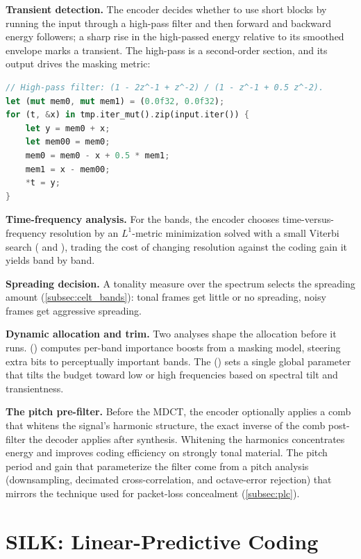 \textbf{Transient detection.} The encoder decides whether to use short blocks by
running the input through a high-pass filter and then forward and backward energy
followers; a sharp rise in the high-passed energy relative to its smoothed
envelope marks a transient. The high-pass is a second-order section, and its
output drives the masking metric:

\begin{lstlisting}[language=Rust]
// High-pass filter: (1 - 2z^-1 + z^-2) / (1 - z^-1 + 0.5 z^-2).
let (mut mem0, mut mem1) = (0.0f32, 0.0f32);
for (t, &x) in tmp.iter_mut().zip(input.iter()) {
    let y = mem0 + x;
    let mem00 = mem0;
    mem0 = mem0 - x + 0.5 * mem1;
    mem1 = x - mem00;
    *t = y;
}
\end{lstlisting}

\textbf{Time-frequency analysis.} For the bands, the encoder chooses time-versus-
frequency resolution by an $L^1$-metric minimization solved with a small Viterbi
search ( and ), trading the cost of changing
resolution against the coding gain it yields band by band.

\textbf{Spreading decision.} A tonality measure over the spectrum selects the
spreading amount (\cref{subsec:celt_bands}): tonal frames get little or no
spreading, noisy frames get aggressive spreading.

\textbf{Dynamic allocation and trim.} Two analyses shape the allocation before it
runs.  () computes per-band
importance boosts from a masking model, steering extra bits to perceptually
important bands. The  ()
sets a single global parameter that tilts the budget toward low or high
frequencies based on spectral tilt and transientness.

\textbf{The pitch pre-filter.} Before the MDCT, the encoder optionally applies a
comb  that whitens the signal's harmonic structure, the exact
inverse of the comb post-filter the decoder applies after synthesis. Whitening
the harmonics concentrates energy and improves coding efficiency on strongly
tonal material. The pitch period and gain that parameterize the filter come from
a pitch analysis (downsampling, decimated cross-correlation, and octave-error
rejection) that mirrors the technique used for packet-loss concealment
(\cref{subsec:plc}).

\section{SILK: Linear-Predictive Coding}\label{sec:silk}

